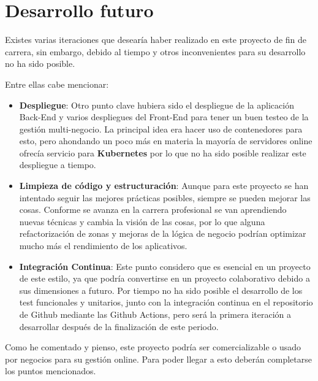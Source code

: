 \section{Desarrollo futuro}

Existes varias iteraciones que desearía haber realizado en este proyecto de fin de carrera, sin embargo, debido al tiempo y otros inconvenientes para su desarrollo no ha sido posible.

Entre ellas cabe mencionar:

\begin{itemize}
    \item \textbf{Despliegue}: Otro punto clave hubiera sido el despliegue de la aplicación Back-End y varios despliegues del Front-End para tener un buen testeo de la gestión multi-negocio. La principal idea era hacer uso de contenedores para esto, pero ahondando un poco más en materia la mayoría de servidores online ofrecía servicio para \textbf{Kubernetes} por lo que no ha sido posible realizar este despliegue a tiempo.
    \item \textbf{Limpieza de código y estructuración}: Aunque para este proyecto se han intentado seguir las mejores prácticas posibles, siempre se pueden mejorar las cosas. Conforme se avanza en la carrera profesional se van aprendiendo nuevas técnicas y cambia la visión de las cosas, por lo que alguna refactorización de zonas y mejoras de la lógica de negocio podrían optimizar mucho más el rendimiento de los aplicativos.
    \item \textbf{Integración Continua}: Este punto considero que es esencial en un proyecto de este estilo, ya que podría convertirse en un proyecto colaborativo debido a sus dimensiones a futuro. Por tiempo no ha sido posible el desarrollo de los test funcionales y unitarios, junto con la integración continua en el repositorio de Github mediante las Github Actions, pero será la primera iteración a desarrollar después de la finalización de este periodo.
\end{itemize}

Como he comentado y pienso, este proyecto podría ser comercializable o usado por negocios para su gestión online. Para poder llegar a esto deberán completarse los puntos mencionados.
